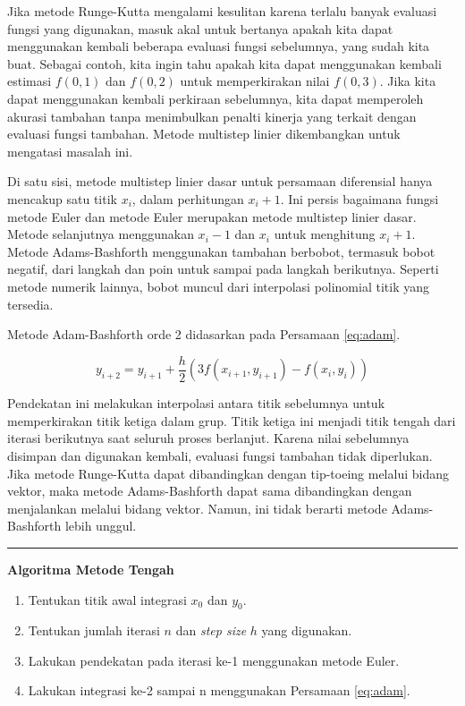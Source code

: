 \documentclass[
]{book}
\providecommand{\tightlist}{%
  \setlength{\itemsep}{0pt}\setlength{\parskip}{0pt}}
\theoremstyle{definition}
\theoremstyle{definition}
\theoremstyle{definition}
\theoremstyle{definition}
\theoremstyle{remark}
\begin{document}
Jika metode Runge-Kutta mengalami kesulitan karena terlalu banyak evaluasi fungsi yang digunakan, masuk akal untuk bertanya apakah kita dapat menggunakan kembali beberapa evaluasi fungsi sebelumnya, yang sudah kita buat. Sebagai contoh, kita ingin tahu apakah kita dapat menggunakan kembali estimasi \(f\left(0,1\right)\) dan \(f\left(0,2\right)\) untuk memperkirakan nilai \(f\left(0,3\right)\). Jika kita dapat menggunakan kembali perkiraan sebelumnya, kita dapat memperoleh akurasi tambahan tanpa menimbulkan penalti kinerja yang terkait dengan evaluasi fungsi tambahan. Metode multistep linier dikembangkan untuk mengatasi masalah ini.

Di satu sisi, metode multistep linier dasar untuk persamaan diferensial hanya mencakup satu titik \(x_i\), dalam perhitungan \(x_i + 1\). Ini persis bagaimana fungsi metode Euler dan metode Euler merupakan metode multistep linier dasar. Metode selanjutnya menggunakan \(x_i − 1\) dan \(x_i\) untuk menghitung \(x_i + 1\). Metode Adams-Bashforth menggunakan tambahan berbobot, termasuk bobot negatif, dari langkah dan poin untuk sampai pada langkah berikutnya. Seperti metode numerik lainnya, bobot muncul dari interpolasi polinomial titik yang tersedia.

Metode Adam-Bashforth orde 2 didasarkan pada Persamaan \eqref{eq:adam}.

\begin{equation}
y_{i+2}=y_{i+1}+\frac{h}{2}\left(3f\left(x_{i+1},y_{i+1}\right)-f\left(x_i,y_i\right)\right)
  \label{eq:adam}
\end{equation}

Pendekatan ini melakukan interpolasi antara titik sebelumnya untuk memperkirakan titik ketiga dalam grup. Titik ketiga ini menjadi titik tengah dari iterasi berikutnya saat seluruh proses berlanjut. Karena nilai sebelumnya disimpan dan digunakan kembali, evaluasi fungsi tambahan tidak diperlukan. Jika metode Runge-Kutta dapat dibandingkan dengan tip-toeing melalui bidang vektor, maka metode Adams-Bashforth dapat sama dibandingkan dengan menjalankan melalui bidang vektor. Namun, ini tidak berarti metode Adams-Bashforth lebih unggul.

\begin{center}\rule{0.5\linewidth}{0.5pt}\end{center}

\textbf{Algoritma Metode Tengah}

\begin{enumerate}
\def\labelenumi{\arabic{enumi}.}
\tightlist
\item
  Tentukan titik awal integrasi \(x_0\) dan \(y_0\).
\item
  Tentukan jumlah iterasi \(n\) dan \emph{step size} \(h\) yang digunakan.
\item
  Lakukan pendekatan pada iterasi ke-1 menggunakan metode Euler.
\item
  Lakukan integrasi ke-2 sampai n menggunakan Persamaan \eqref{eq:adam}.
\end{enumerate}
\end{document}
